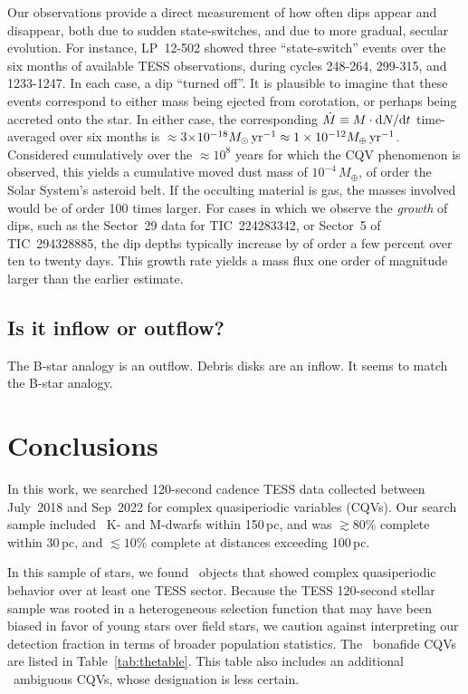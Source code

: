 \documentclass[11pt,twocolumn,tighten]{aastex63}
\begin{document}
Our observations provide a direct measurement of how often dips
appear and disappear, both due to sudden state-switches, and
due to more gradual, secular evolution.  For instance, LP~12-502
showed three ``state-switch'' events over the six months of available TESS
observations, during cycles 248-264, 299-315, and 1233-1247.  In each
case, a dip ``turned off''.  It is
plausible to imagine that these events correspond to either mass being
ejected from corotation, or perhaps being accreted onto the star.  In
either case, the corresponding $\dot{M} \equiv M\cdot {\rm d}N/{\rm d}t$
time-averaged over six months
is $\approx$3$\times$$10^{-18} M_\odot\,{\rm yr}^{-1} \approx
1\times10^{-12} M_\oplus\,{\rm yr}^{-1}$.  Considered cumulatively
over the $\approx$$10^8$ years for which the CQV phenomenon is
observed, this yields a cumulative moved dust mass of
$10^{-4}\,M_\oplus$, of order the Solar System's asteroid belt.
If the occulting material is gas, the masses involved would be of
order 100 times larger.
For cases in which we observe the {\it growth} of
dips, such as the Sector~29 data for TIC~224283342,
or Sector~5 of TIC~294328885,
the dip depths
typically increase by of order a few percent over ten to twenty days.
This growth rate yields a mass flux one order of magnitude larger
than the earlier estimate.


\subsection{Is it inflow or outflow?}

The B-star analogy is an outflow.
Debris disks are an inflow.
It seems to match the B-star analogy.




\section{Conclusions}
\label{sec:conclusion}

In this work, we searched 120-second cadence TESS data collected
between July~2018 and Sep~2022 for complex quasiperiodic variables
(CQVs).  Our search sample included \nstarssearched\ K- and M-dwarfs
within 150\,pc, and was $\gtrsim 80\%$ complete within 30\,pc, and
$\lesssim 10\%$ complete at distances exceeding 100\,pc.

In this sample of stars, we found \ngoods\ objects that showed complex
quasiperiodic behavior over at least one TESS sector.  Because the
TESS 120-second stellar sample was rooted in a heterogeneous selection
function that may have been biased in favor of young stars over field
stars, we caution against interpreting our detection fraction in
terms of broader population statistics.  The \ngoods\ bonafide
CQVs are listed in Table~\ref{tab:thetable}.  This table also includes
an additional \nmaybes\ ambiguous CQVs, whose designation is less
certain.
\end{document}
